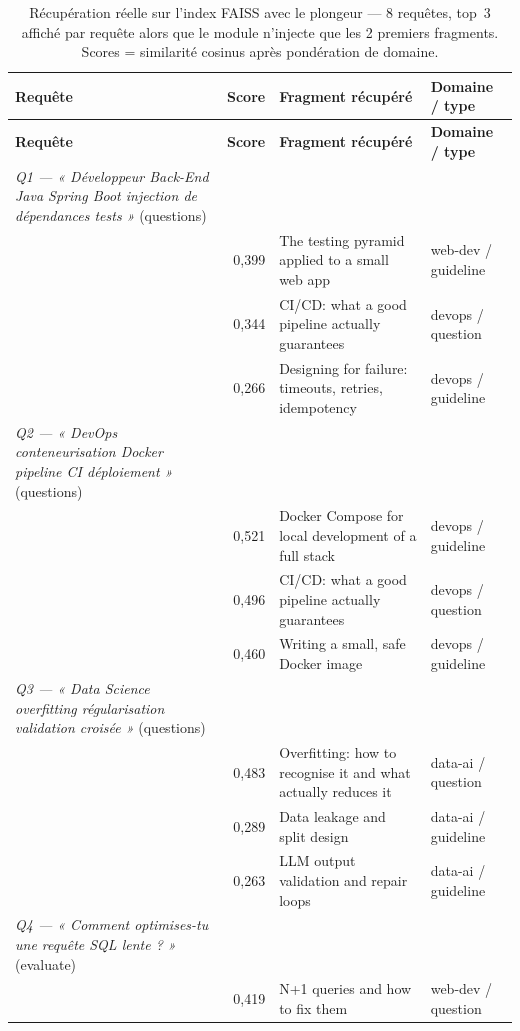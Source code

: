 \begin{small}
\begin{longtable}{@{}>{\cellflush}p{4.0cm} r
                  >{\cellflush}p{6.0cm}
                  >{\cellflush}p{3.0cm}@{}}
\caption{Récupération réelle sur l'index FAISS avec le plongeur
 --- 8 requêtes, top~3 affiché par requête alors que le
module n'injecte que les 2 premiers fragments. Scores = similarité cosinus après
pondération de domaine.}\label{tab:retrieval}\\
\toprule
\textbf{Requête} & \textbf{Score} & \textbf{Fragment récupéré} & \textbf{Domaine / type} \\
\midrule
\endfirsthead
\toprule
\textbf{Requête} & \textbf{Score} & \textbf{Fragment récupéré} & \textbf{Domaine / type} \\
\midrule
\endhead
\bottomrule
\endlastfoot
\emph{Q1 --- « Développeur Back-End Java Spring Boot injection de dépendances tests »} (questions) & & & \\
 & 0,399 & The testing pyramid applied to a small web app & web-dev / guideline \\
 & 0,344 & CI/CD: what a good pipeline actually guarantees & devops / question \\
 & 0,266 & Designing for failure: timeouts, retries, idempotency & devops / guideline \\
\addlinespace
\emph{Q2 --- « DevOps conteneurisation Docker pipeline CI déploiement »} (questions) & & & \\
 & 0,521 & Docker Compose for local development of a full stack & devops / guideline \\
 & 0,496 & CI/CD: what a good pipeline actually guarantees & devops / question \\
 & 0,460 & Writing a small, safe Docker image & devops / guideline \\
\addlinespace
\emph{Q3 --- « Data Science overfitting régularisation validation croisée »} (questions) & & & \\
 & 0,483 & Overfitting: how to recognise it and what actually reduces it & data-ai / question \\
 & 0,289 & Data leakage and split design & data-ai / guideline \\
 & 0,263 & LLM output validation and repair loops & data-ai / guideline \\
\addlinespace
\emph{Q4 --- « Comment optimises-tu une requête SQL lente ? »} (evaluate) & & & \\
 & 0,419 & N+1 queries and how to fix them & web-dev / question \\

\end{longtable}
\end{small}

